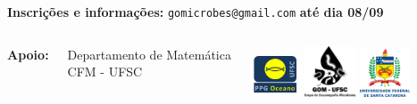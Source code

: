 \documentclass{beamer}
\begin{document}
\begin{frame}
\small{%
\textbf{Inscrições e informações:} \texttt{gomicrobes@gmail.com} \textbf{até dia 08/09}
}
\begin{columns}
\column{1cm}
\column{1cm}
\tiny{\textbf{Apoio:}}
\column{2.5cm}
\begin{center}\tiny{Departamento de Matemática\\CFM - UFSC}\end{center}
\column{1.6cm}
\includegraphics[width=1.5cm]{brasao_1678.png}
\column{1.6cm}
\includegraphics[width=1.5cm]{GOM1BW.png}
\column{1.6cm}
\includegraphics[width=1.5cm]{brasao_UFSC.png}
\column{2cm}
\end{columns}
\end{frame}
\end{document}
